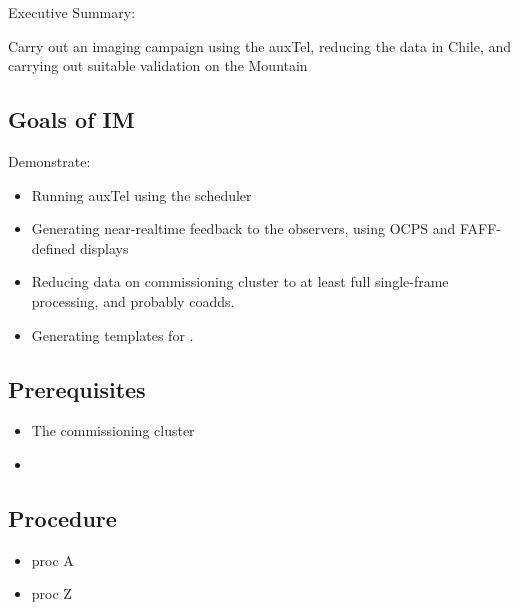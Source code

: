 
Executive Summary:

Carry out an imaging campaign using the auxTel, reducing the data in Chile, and
carrying out suitable validation on the Mountain

\subsection{Goals of IM}
Demonstrate:
\begin{itemize}
\item Running auxTel using the scheduler
\item Generating near-realtime feedback to the observers, using OCPS and FAFF-defined displays
\item Reducing data on commissioning cluster to at least full single-frame processing, and probably coadds.
\item Generating templates for .
\end{itemize}

\subsection{Prerequisites}
\begin{itemize}
\item The commissioning cluster
\item {}
\end{itemize}

\subsection{Procedure}
\begin{itemize}
\item proc A
\item proc Z
\end{itemize}
